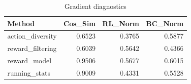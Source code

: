 \begin{table}[htbp]
\centering
\caption{Gradient diagnostics}
\label{tab:grad-diag}
\begin{tabular}{lrrr}
\toprule
\textbf{Method} & \textbf{Cos\_Sim} & \textbf{RL\_Norm} & \textbf{BC\_Norm} \\
\midrule
action\_diversity & 0.6523 & 0.3765 & 0.5877 \\
reward\_filtering & 0.6039 & 0.5642 & 0.4366 \\
reward\_model & 0.9506 & 0.5677 & 0.6015 \\
running\_stats & 0.9009 & 0.4331 & 0.5528 \\
\bottomrule
\end{tabular}
\end{table}